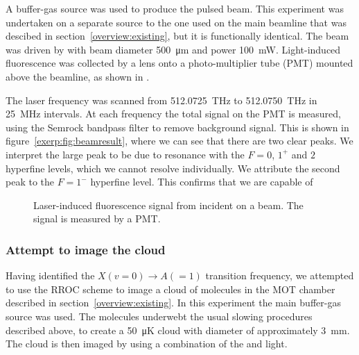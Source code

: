 A buffer-gas source  was used to produce the pulsed \CaF{} beam.  This
experiment was undertaken on a separate \CaF{} source to the one used on the
main beamline that was descibed in section~\ref{overview:existing}, but it is
functionally identical.  The beam was driven by  with beam
diameter \SI{500}{\micro\meter} and power \SI{100}{\milli\watt}.  Light-induced
fluorescence was collected by a lens onto a photo-multiplier tube (PMT) mounted
above the beamline, as shown in .

The laser frequency was scanned from \SI{512.0725}{\tera\hertz} to
\SI{512.0750}{\tera\hertz} in \SI{25}{\mega\hertz} intervals. At each
frequency the total signal on the PMT is measured, using the Semrock
bandpass filter to remove background signal. This is shown in
figure~\ref{exerp:fig:beamresult}, where we can see that there are two clear
peaks. We interpret the large peak to be due to resonance with the $F=0$, $1^+$
and $2$ hyperfine levels, which we cannot resolve individually. We attribute
the second peak to the $F=1^-$ hyperfine level. This confirms that we are
capable of 

\begin{figure}[htb]
  \centering
  \caption{Laser-induced fluorescence signal from  incident on a
  \CaF{} beam. The signal is measured by a PMT.}
  \label{exper:fig:beamresult}
\end{figure}

\subsubsection{Attempt to image the \CaF{} cloud}

Having identified the $X(v=0)\rightarrow A(=1)$ transition frequency, we
attempted to use the RROC scheme to image a cloud of \CaF{} molecules in the
MOT chamber described in section~\ref{overview:existing}. In this experiment
the main \CaF{} buffer-gas source was used. The molecules underwebt the usual
slowing procedures described above, to create a \SI{50}{\micro\kelvin} cloud
with diameter of approximately \SI{3}{\milli\meter}. The cloud is then imaged
by using a combination of the  and  light.

